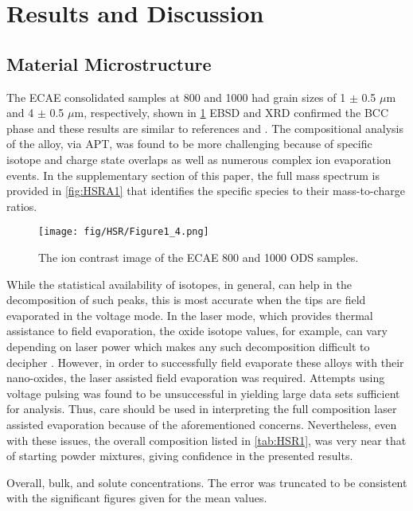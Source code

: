 \section*{Results and Discussion}
	\subsection*{Material Microstructure} 
		The ECAE consolidated samples at 800 \celsius{} and 1000 \celsius{}   had grain sizes of 1 $\pm{}$ 0.5  $\mu$m and 4 $\pm{}$ 0.5  $\mu$m, respectively, shown in \ref{fig:HSR1} EBSD and XRD confirmed the BCC phase and these results are similar to references \cite{RN476} and \cite{RN740}. The compositional analysis of the alloy, via APT, was found to be more challenging because of specific isotope and charge state overlaps as well as numerous complex ion evaporation events. In the supplementary section of this paper, the full mass spectrum is provided in \ref{fig:HSRA1} that identifies the specific species to their mass-to-charge ratios.

		\begin{figure}
			\centering
			\texttt{[image: fig/HSR/Figure1\_4.png]}
			\caption{The ion contrast image of the ECAE 800 \celsius{} and 1000 \celsius{} ODS samples.}
			\label{fig:HSR1}
		\end{figure}
		
		While the statistical availability of isotopes, in general, can help in the decomposition of such peaks, this is most accurate when the tips are field evaporated in the voltage mode. In the laser mode, which provides thermal assistance to field evaporation, the oxide isotope values, for example, can vary depending on laser power which makes any such decomposition difficult to decipher \cite{RN110}. However, in order to successfully field evaporate these alloys with their nano-oxides, the laser assisted field evaporation was required. Attempts using voltage pulsing was found to be unsuccessful in yielding large data sets sufficient for analysis. Thus, care should be used in interpreting the full composition laser assisted evaporation because of the aforementioned concerns. Nevertheless, even with these issues, the overall composition listed in \ref{tab:HSR1}, was very near that of starting powder mixtures, giving confidence in the presented results.  
		
		\begin{table}[]
			\caption[Overall, bulk, and solute concentrations of ODS Fe\textsubscript{91}Ni\textsubscript{8}Zr\textsubscript{1}]{Overall, bulk, and solute concentrations. The error was truncated to be consistent with the significant figures given for the mean values.}
			\captionsetup[table]{position=top}
			
			\label{tab:HSR1}
		\end{table}
		
